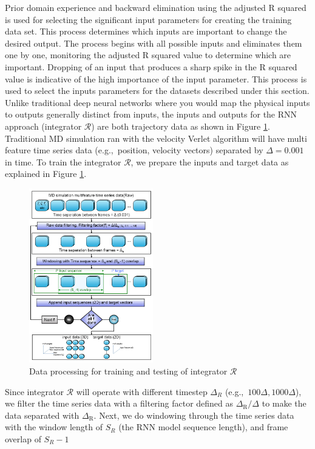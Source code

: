 \documentclass[aps,prl,twocolumn,superscriptaddress,tightenlines,longbibliography, reprint]{revtex4-1}
\newcommand{\eg}{e.g.,}
\begin{document}
Prior domain experience and backward elimination using the adjusted R squared is used for selecting the  significant input parameters for creating the training data set. 
This process determines which inputs are important to change the desired output. The process begins with all possible inputs and eliminates them one by one, monitoring the adjusted R squared value to determine which are important. Dropping of an input that produces a sharp spike in the R squared value is indicative of the high importance of the input parameter. 
This process is used to select the inputs parameters for the datasets described under this section. 
Unlike traditional deep neural networks where you would map the physical inputs to outputs generally distinct from inputs, the inputs and outputs for the RNN approach (integrator $\mathscr{R}$) are both trajectory data as shown in Figure \ref{fig:dataprocessing}. Traditional MD simulation ran with the velocity Verlet algorithm will have multi feature time series data (\eg\ position, velocity vectors) separated by $\Delta =0.001$ in time. To train the integrator $\mathscr{R}$, we prepare the inputs and target data as explained in Figure \ref{fig:dataprocessing}. 
\begin{figure}[htb]
\centering
\includegraphics[width=0.48\textwidth]{figures/fig6.jpg}
\caption{Data processing for training and testing of integrator $\mathscr{R}$}
\label{fig:dataprocessing}
\end{figure}
Since integrator $\mathscr{R}$ will operate with different timestep $\Delta_{R}$ (\eg\ $100\Delta, 1000\Delta$), we filter the time series data with a filtering factor defined as $\Delta_{\mathrm{R}}/\Delta$ to make the data separated with $\Delta_{\mathrm{R}}$. Next, we do windowing through the time series data with the window length of $S_R$ (the RNN model sequence length), and frame overlap of $S_R -1$
\end{document}
